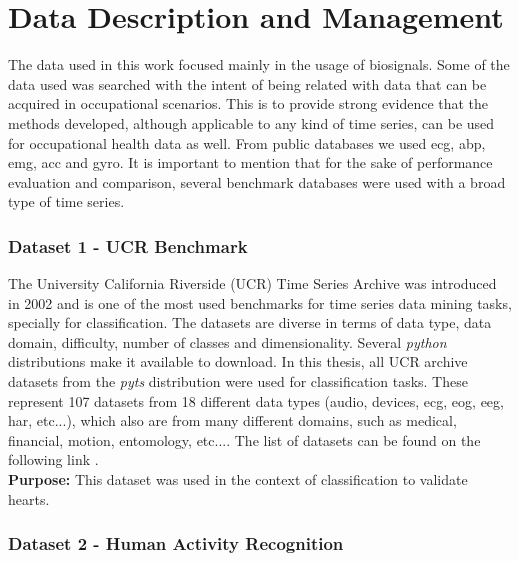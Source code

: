
%

\chapter{Data Description and Management}
\label{cha:data}

The data used in this work focused mainly in the usage of biosignals. Some of the data used was searched with the intent of being related with data that can be acquired in occupational scenarios. This is to provide strong evidence that the methods developed, although applicable to any kind of time series, can be used for occupational health data as well. From public databases we used \gls{ecg}, \gls{abp}, \gls{emg}, \gls{acc} and \gls{gyro}. It is important to mention that for the sake of performance evaluation and comparison, several benchmark databases were used with a broad type of time series.

\subsection{Dataset 1 - UCR Benchmark}

The University California Riverside (UCR) Time Series Archive was introduced in 2002 and is one of the most used benchmarks for time series data mining tasks, specially for classification. The datasets are diverse in terms of data type, data domain, difficulty, number of classes and dimensionality\cite{ucr}. Several \textit{python} distributions make it available to download. In this thesis, all UCR archive datasets from the \textit{pyts} distribution were used for classification tasks. These represent 107 datasets from 18 different data types (audio, devices, \gls{ecg}, \gls{eog}, \gls{eeg}, \gls{har}, etc...), which also are from many different domains, such as medical, financial, motion, entomology, etc...\cite{ucr}. The list of datasets can be found on the following link \cite{ucr_site}.\\
\textbf{Purpose:} This dataset was used in the context of classification to validate \gls{hearts}. 
 
\subsection{Dataset 2 - Human Activity Recognition}

